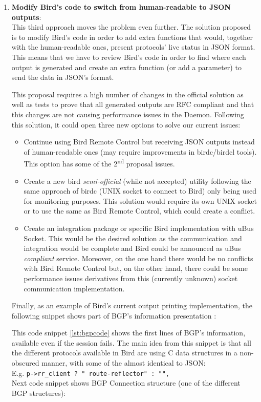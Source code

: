 \begin{enumerate}
    \item \textbf{Modify Bird's code to switch from human-readable to JSON outputs}:\\
This third approach moves the problem even further. The solution proposed is to modify Bird's code in order to add extra functions that would, together with the human-readable ones, present protocols' live status in JSON format. This means that we have to review Bird's code in order to find where each output is generated and create an extra function (or add a parameter) to send the data in JSON's format.

This proposal requires a high number of changes in the official solution as well as tests to prove that all generated outputs are RFC compliant \cite{json} and that this changes are not causing performance issues in the Daemon. Following this solution, it could open three new options to solve our current issues:
   \begin{itemize}
        \item Continue using Bird Remote Control but receiving JSON outputs instead of human-readable ones (may require improvements in birdc/birdcl tools).
        This option has some of the 2\textsuperscript{nd} proposal issues.
        \item Create a new bird \textit{semi-official} (while not accepted) utility following the same approach of birdc (UNIX socket to connect to Bird) only being used for monitoring purposes.
        This solution would require its own UNIX socket or to use the same as Bird Remote Control, which could create a conflict.
        \item Create an integration package or specific Bird implementation with uBus Socket. This would be the desired solution as the communication and integration would be complete and Bird could be announced as uBus \textit{compliant} service. Moreover, on the one hand there would be no conflicts with Bird Remote Control but, on the other hand, there could be some performance issues derivatives from this (currently unknown) socket communication implementation.
   \end{itemize}

Finally, as an example of Bird's current output printing implementation, the following snippet shows part of BGP's  information presentation \cite{bgpsn}:



This code snippet \ref{lst:bgpcode} shows the first lines of BGP's information, available even if the session fails. The main idea from this snippet is that all the different protocols available in Bird are using C data structures in a non-obscured manner, with some of the almost identical to JSON:\\E.g. \texttt{p->rr\_client ? " route-reflector" : "",}\\Next code snippet shows BGP Connection structure (one of the different BGP structures):


\end{enumerate}
